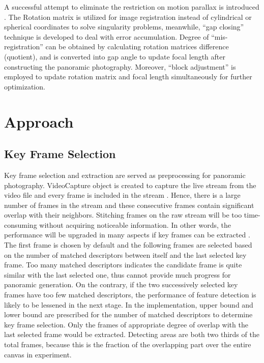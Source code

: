 \documentclass[runningheads]{llncs}
\begin{document}
A successful attempt to eliminate the restriction on motion parallax is introduced \cite{szeliski1997creating}. The Rotation matrix is utilized for image registration instead of cylindrical or spherical coordinates to solve singularity problems, meanwhile, ``gap closing'' technique is developed to deal with error accumulation. Degree of ``mis-registration'' can be obtained by calculating rotation matrices difference (quotient), and is converted into gap angle to update focal length after constructing the panoramic photography. Moreover, ``block adjustment'' is employed to update rotation matrix and focal length simultaneously for further optimization.


\section{Approach}

\subsection{Key Frame Selection}

Key frame selection and extraction are served as preprocessing for panoramic photography. VideoCapture object is created to capture the live stream from the video file and every frame is included in the stream \cite{opencv}. Hence, there is a large number of frames in the stream and these consecutive frames contain significant overlap with their neighbors. Stitching frames on the raw stream will be too time-consuming without acquiring noticeable information. In other words, the performance will be upgraded in many aspects if key frames can be extracted \cite{fadaeieslam2009key}. The first frame is chosen by default and the following frames are selected based on the number of matched descriptors between itself and the last selected key frame. Too many matched descriptors indicates the candidate frame is quite similar with the last selected one, thus cannot provide much progress for panoramic generation. On the contrary, if the two successively selected key frames have too few matched descriptors, the performance of feature detection is likely to be lessened in the next stage. In the implementation, upper bound and lower bound are prescribed for the number of matched descriptors to determine key frame selection. Only the frames of appropriate degree of overlap with the last selected frame would be extracted. Detecting areas are both two thirds of the total frames, because this is the fraction of the overlapping part over the entire canvas in experiment.
\end{document}
